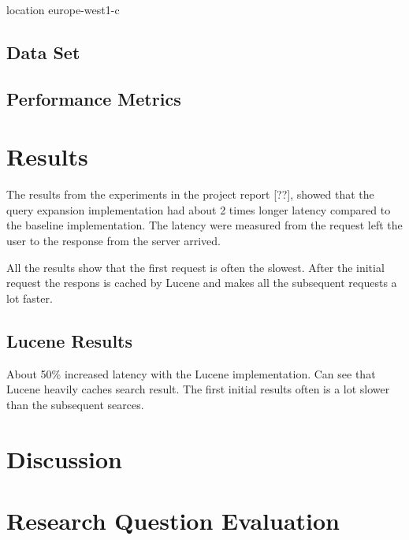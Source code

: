 location europe-west1-c

\subsection{Data Set}
\label{sec:dataset}

\subsection{Performance Metrics}

\section{Results}
\label{sec:results}
The results from the experiments in the project report [??],
showed that the query expansion implementation had about 2 times longer latency compared to the baseline implementation.
The latency were measured from the request left the user to the response from the server arrived.

All the results show that the first request is often the slowest.
After the initial request the respons is cached by Lucene and makes all the subsequent requests a lot faster.

\subsection{Lucene Results}
About 50\% increased latency with the Lucene implementation.
Can see that Lucene heavily caches search result.
The first initial results often is a lot slower than the subsequent searces.

\section{Discussion}

\section{Research Question Evaluation}
